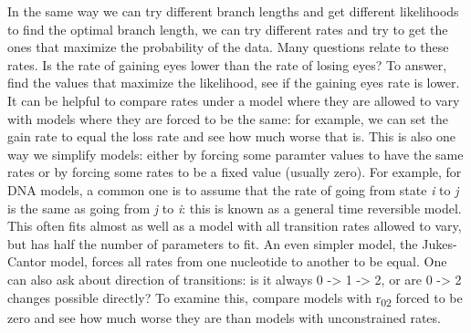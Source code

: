 \documentclass[]{article}
\begin{document}
In the same way we can try different branch lengths and get different likelihoods to find the optimal branch length, we can try different rates and try to get the ones that maximize the probability of the data. Many questions relate to these rates. Is the rate of gaining eyes lower than the rate of losing eyes? To answer, find the values that maximize the likelihood, see if the gaining eyes rate is lower. It can be helpful to compare rates under a model where they are allowed to vary with models where they are forced to be the same: for example, we can set the gain rate to equal the loss rate and see how much worse that is. This is also one way we simplify models: either by forcing some paramter values to have the same rates or by forcing some rates to be a fixed value (usually zero). For example, for DNA models, a common one is to assume that the rate of going from state \emph{i} to \emph{j} is the same as going from \emph{j} to \emph{i}: this is known as a general time reversible model. This often fits almost as well as a model with all transition rates allowed to vary, but has half the number of parameters to fit. An even simpler model, the Jukes-Cantor model, forces all rates from one nucleotide to another to be equal. One can also ask about direction of transitions: is it always 0 -\textgreater{} 1 -\textgreater{} 2, or are 0 -\textgreater{} 2 changes possible directly? To examine this, compare models with r\textsubscript{02} forced to be zero and see how much worse they are than models with unconstrained rates.
\end{document}
